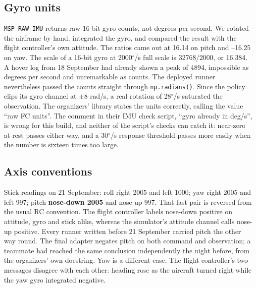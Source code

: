 \documentclass{article}
\begin{document}
\subsection{Gyro units}
\texttt{MSP\_RAW\_IMU} returns raw 16-bit gyro counts, not degrees per second. We rotated the airframe by hand, integrated the gyro, and compared the result with the flight controller's own attitude. The ratios came out at 16.14 on pitch and --16.25 on yaw. The scale of a 16-bit gyro at 2000$^\circ$/s full scale is 32768/2000, or 16.384. A hover log from 18 September had already shown a peak of 4894, impossible as degrees per second and unremarkable as counts. The deployed runner nevertheless passed the counts straight through \texttt{np.radians()}. Since the policy clips its gyro channel at $\pm$8 rad/s, a real rotation of 28$^\circ$/s saturated the observation. The organizers' library states the units correctly, calling the value ``raw FC units''. The comment in their IMU check script, ``gyro already in deg/s'', is wrong for this build, and neither of the script's checks can catch it: near-zero at rest passes either way, and a 30$^\circ$/s response threshold passes more easily when the number is sixteen times too large.

\subsection{Axis conventions}
Stick readings on 21 September: roll right 2005 and left 1000; yaw right 2005 and left 997; pitch \textbf{nose-down 2005} and nose-up 997. That last pair is reversed from the usual RC convention. The flight controller labels nose-down positive on attitude, gyro and stick alike, whereas the simulator's attitude channel calls nose-up positive. Every runner written before 21 September carried pitch the other way round. The final adapter negates pitch on both command and observation; a teammate had reached the same conclusion independently the night before, from the organizers' own docstring. Yaw is a different case. The flight controller's two messages disagree with each other: heading rose as the aircraft turned right while the yaw gyro integrated negative.
\end{document}
